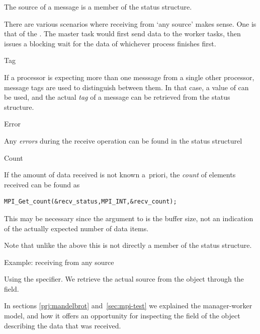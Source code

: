 The source of a message is a member of the status structure.


There are various scenarios where receiving from `any source' makes sense.
One is that of the . The master task would first send
data to the worker tasks, then issues a blocking wait for the data of whichever process
finishes first.

 {Tag}

If a processor is expecting more than one messsage from a single other processor,
message tags are used to distinguish between them. In that case,
a value of  can be used, and the actual
\emph{tag}
of a message can be retrieved from the status structure.


 {Error}

Any \emph{errors}
during the receive operation can be found in the status
structurel


 {Count}

If the amount of data received is not known a~priori, the
\emph{count} of elements received
can be found as
\begin{lstlisting}
MPI_Get_count(&recv_status,MPI_INT,&recv_count);
\end{lstlisting}
This may be necessary since the  argument to  is 
the buffer size, not an indication of the actually expected number of
data items.

Note that unlike the above this is not directly a member of the status
structure.


 {Example: receiving from any source}

Using the  specifier. We retrieve the
actual source from the  object through the
 field.
%
%

In sections \ref{prj:mandelbrot} and~\ref{sec:mpi-test} we explained
the manager-worker model, and how it offers an opportunity for inspecting the
 field of the 
object describing the data that was received.

